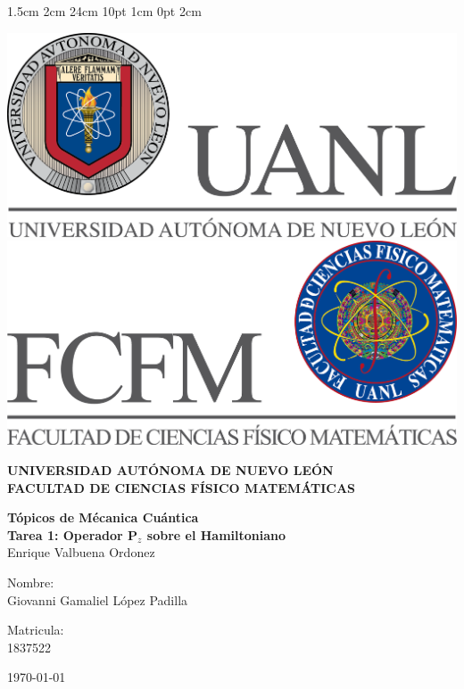\documentclass[12pt,letterpaper]{report}
\begin{document}
\setmargins{2.5cm}      
{1.5cm}                     
{2cm}  
{24cm}                    
{10pt}                          
{1cm}                          
{0pt}                             
{2cm}
\begin{titlepage}
\begin{center}
\includegraphics[scale=0.40]{../../Logos/uanl.png} 
\hspace{2.5cm}
\includegraphics[scale=0.40]{../../Logos/fcfm.png}
\end{center}
\vspace{2cm}
\begin{center}
\textbf{
UNIVERSIDAD AUTÓNOMA DE NUEVO LEÓN\\
FACULTAD DE CIENCIAS
    FÍSICO MATEMÁTICAS}\\
\vspace*{2cm}
\begin{large}
\vspace{1cm}
\large{\textbf{Tópicos de Mécanica Cuántica}}\\
\textbf{Tarea 1: Operador P$_{z}$ sobre el Hamiltoniano}\\
Enrique Valbuena Ordonez\\
\end{large}
\vspace{3.5cm}
\begin{minipage}{0.6\linewidth}
\vspace{0.5cm}
\changefontsizes{14pt}
Nombre:\\
Giovanni Gamaliel López Padilla\\
\end{minipage}
\begin{minipage}{0.2\linewidth}
\changefontsizes{14pt}
Matricula:\\
1837522
\end{minipage}
\end{center}
\vspace{4cm}
\begin{flushright}
\today
\end{flushright}
\end{titlepage}
\end{document}
